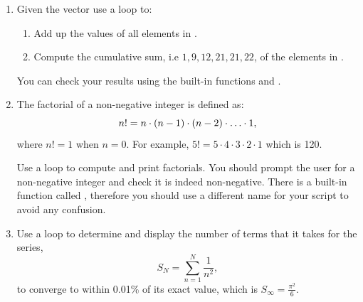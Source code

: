 {\begin{minipage}{\linewidth}
\begin{enumerate}
\begin{enumerate}
	  \end{enumerate}
\item Given the vector  use a  loop to:
\begin{enumerate}
\item Add up the values of all elements in .
\item Compute the cumulative sum, i.e $1,9,12,21,21,22$, of the elements in .
\end{enumerate}
You can check your results using the built-in functions  and .
\item The factorial of a non-negative integer is defined as:
\begin{equation*}
n! = n \cdot (n - 1) \cdot (n - 2) \cdot \mathellipsis \cdot 1,
\end{equation*}
where $n!=1$ when $n=0$. For example, $5! = 5 \cdot 4 \cdot 3 \cdot 2 \cdot 1$ which is 120. 

Use a  loop to compute and print factorials. You should prompt the user for a non-negative integer and check it is indeed non-negative. There is a built-in function called , therefore you should use a different name for your script to avoid any confusion.
\item Use a  loop to determine and display the number of terms that it takes for the series,
\begin{equation*}
S_N = \sum_{n=1}^{N}\frac{1}{n^2},
\end{equation*}
to converge to within 0.01\% of its exact value, which is $S_\infty = \frac{\pi^2}{6}$.	  
\end{enumerate}


\end{minipage}}
